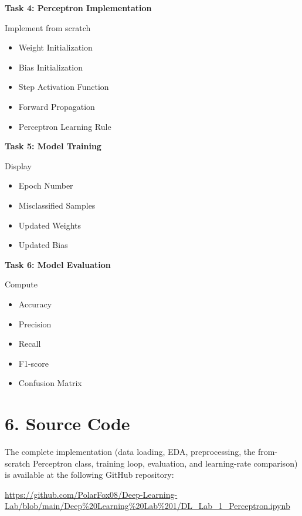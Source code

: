 \documentclass[11pt]{article}
\begin{document}
\vspace{2mm}

\textbf{Task 4: Perceptron Implementation}

Implement from scratch

\begin{itemize}
\item Weight Initialization
\item Bias Initialization
\item Step Activation Function
\item Forward Propagation
\item Perceptron Learning Rule
\end{itemize}

\vspace{2mm}

\textbf{Task 5: Model Training}

Display

\begin{itemize}
\item Epoch Number
\item Misclassified Samples
\item Updated Weights
\item Updated Bias
\end{itemize}

\vspace{2mm}

\textbf{Task 6: Model Evaluation}

Compute

\begin{itemize}
\item Accuracy
\item Precision
\item Recall
\item F1-score
\item Confusion Matrix
\end{itemize}


\section*{6. Source Code}

The complete implementation (data loading, EDA, preprocessing, the from-scratch Perceptron class, training loop, evaluation, and learning-rate comparison) is available at the following GitHub repository:

\begin{center}
\url{https://github.com/PolarFox08/Deep-Learning-Lab/blob/main/Deep%20Learning%20Lab%201/DL_Lab_1_Perceptron.ipynb}
\end{center}
\end{document}
